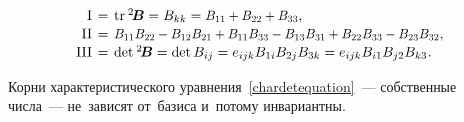 \begin{otherlanguage}{russian}
\vspace{-0.25em}\begin{equation}\label{invariants:2}
\begin{array}{r@{\hspace{0.4em}}c@{\hspace{0.4em}}l}
\mathrm{I} & = & \operatorname{tr}\hspace{0.1ex} {^2\!\bm{B}} = B_{kk} = \scalebox{0.92}[0.96]{$B_{11} + B_{22} + B_{33}$},\\[0.1em]
\mathrm{II} & = & \scalebox{0.92}[0.96]{$B_{11}B_{22} - B_{12}B_{21} + B_{11}B_{33} - B_{13}B_{31} + B_{22}B_{33} - B_{23}B_{32}$},\\[0.1em]
\mathrm{III} & = & \operatorname{det} \hspace{0.1ex} {^2\!\bm{B}} = \operatorname{det} B_{ij} = e_{ijk} B_{1i} B_{2j} B_{3k} = e_{ijk} B_{i1} B_{j2} B_{k3} \hspace{0.1ex}.
\end{array}\end{equation}

Корни характеристического уравнения~\eqref{chardetequation}~--- собственные числа~--- не~зависят от~базиса и~потому инвариантны.


\end{otherlanguage}

